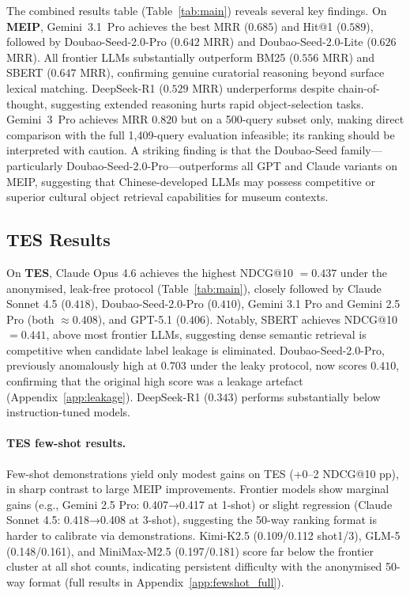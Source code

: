 \documentclass[11pt]{article}
\begin{document}
The combined results table (Table~\ref{tab:main}) reveals several key findings.
On \textbf{MEIP}, Gemini~3.1~Pro achieves the best MRR ($0.685$) and Hit@1 ($0.589$),
followed by Doubao-Seed-2.0-Pro ($0.642$ MRR) and Doubao-Seed-2.0-Lite ($0.626$ MRR).
All frontier LLMs substantially outperform BM25 ($0.556$ MRR) and SBERT ($0.647$ MRR),
confirming genuine curatorial reasoning beyond surface lexical matching.
DeepSeek-R1 ($0.529$ MRR) underperforms despite chain-of-thought,
suggesting extended reasoning hurts rapid object-selection tasks.
Gemini~3~Pro achieves MRR $0.820$ but on a 500-query subset only,
making direct comparison with the full 1{,}409-query evaluation infeasible;
its ranking should be interpreted with caution.
A striking finding is that the Doubao-Seed family---particularly
Doubao-Seed-2.0-Pro---outperforms all GPT and Claude variants on MEIP,
suggesting that Chinese-developed LLMs may possess competitive or superior
cultural object retrieval capabilities for museum contexts.

\subsection{TES Results}

On \textbf{TES}, Claude Opus 4.6 achieves the highest NDCG@10 $= 0.437$ under the
anonymised, leak-free protocol (Table~\ref{tab:main}), closely followed by
Claude Sonnet 4.5 ($0.418$), Doubao-Seed-2.0-Pro ($0.410$),
Gemini 3.1 Pro and Gemini 2.5 Pro (both $\approx 0.408$), and GPT-5.1 ($0.406$).
Notably, SBERT achieves NDCG@10 $= 0.441$, above most frontier LLMs, suggesting
dense semantic retrieval is competitive when candidate label leakage is eliminated.
Doubao-Seed-2.0-Pro, previously anomalously high at $0.703$ under the leaky protocol,
now scores $0.410$, confirming that the original high score was a leakage artefact
(Appendix~\ref{app:leakage}).
DeepSeek-R1 ($0.343$) performs substantially below instruction-tuned models.

\paragraph{TES few-shot results.}
Few-shot demonstrations yield only modest gains on TES (+0--2 NDCG@10 pp),
in sharp contrast to large MEIP improvements.
Frontier models show marginal gains (e.g., Gemini 2.5 Pro: 0.407→0.417 at 1-shot)
or slight regression (Claude Sonnet 4.5: 0.418→0.408 at 3-shot), suggesting the
50-way ranking format is harder to calibrate via demonstrations.
Kimi-K2.5 (0.109/0.112 shot1/3), GLM-5 (0.148/0.161), and MiniMax-M2.5 (0.197/0.181)
score far below the frontier cluster at all shot counts,
indicating persistent difficulty with the anonymised 50-way format
(full results in Appendix~\ref{app:fewshot_full}).
\end{document}
